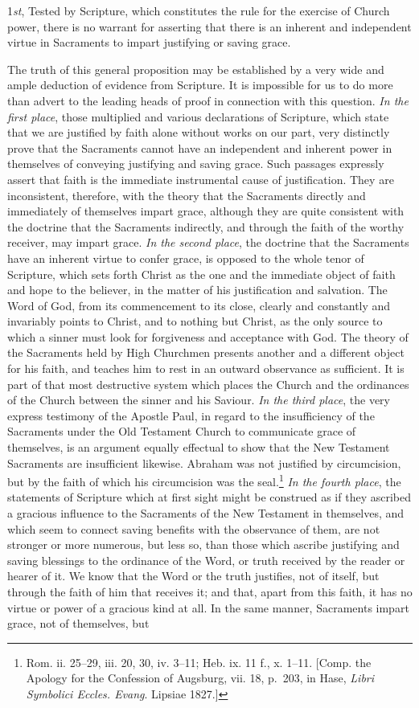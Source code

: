 \documentclass[english,]{book}
\begin{document}
1\emph{st}, Tested by Scripture, which constitutes the rule for the exercise of Church power, there is no warrant for asserting that there is an inherent and independent virtue in Sacraments to impart justifying or saving grace.

The truth of this general proposition may be established by a very wide and ample deduction of evidence from Scripture. It is impossible for us to do more than advert to the leading heads of proof in connection with this question. \emph{In the first place}, those multiplied and various declarations of Scripture, which state that we are justified by faith alone without works on our part, very distinctly prove that the Sacraments cannot have an independent and inherent power in themselves of conveying justifying and saving grace. Such passages expressly assert that faith is the immediate instrumental cause of justification. They are inconsistent, therefore, with the theory that the Sacraments directly and immediately of themselves impart grace, although they are quite consistent with the doctrine that the Sacraments indirectly, and through the faith of the worthy receiver, may impart grace. \emph{In the second place}, the doctrine that the Sacraments have an inherent virtue to confer grace, is opposed to the whole tenor of Scripture, which sets forth Christ as the one and the immediate object of faith and hope to the believer, in the matter of his justification and salvation. The Word of God, from its commencement to its close, clearly and constantly and invariably points to Christ, and to nothing but Christ, as the only source to which a sinner must look for forgiveness and acceptance with God. The theory of the Sacraments held by High Churchmen presents another and a different object for his faith, and teaches him to rest in an outward observance as sufficient. It is part of that most destructive system which places the Church and the ordinances of the Church between the sinner and his Saviour. \emph{In the third place}, the very express testimony of the Apostle Paul, in regard to the insufficiency of the Sacraments under the Old Testament Church to communicate grace of themselves, is an argument equally effectual to show that the New Testament Sacraments are insufficient likewise. Abraham was not justified by circumcision, but by the faith of which his circumcision was the seal.\footnote{Rom. ii. 25--29, iii. 20, 30, iv. 3--11; Heb. ix. 11 f., x. 1--11. {[}Comp. the Apology for the Confession of Augsburg, vii. 18, p.~203, in Hase, \emph{Libri Symbolici Eccles. Evang}. Lipsiae 1827.{]}} \emph{In the fourth place}, the statements of Scripture which at first sight might be construed as if they ascribed a gracious influence to the Sacraments of the New Testament in themselves, and which seem to connect saving benefits with the observance of them, are not stronger or more numerous, but less so, than those which ascribe justifying and saving blessings to the ordinance of the Word, or truth received by the reader or hearer of it. We know that the Word or the truth justifies, not of itself, but through the faith of him that receives it; and that, apart from this faith, it has no virtue or power of a gracious kind at all. In the same manner, Sacraments impart grace, not of themselves, but 
\end{document}
